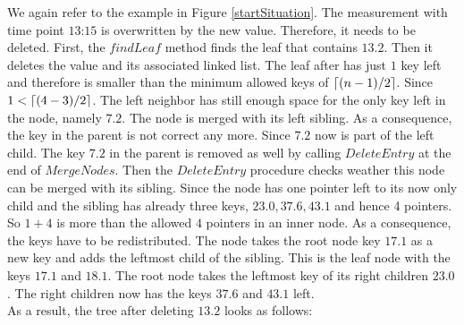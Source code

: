 \documentclass[abstracton,12pt]{scrreprt}
\DeclarePairedDelimiter\ceil{\lceil}{\rceil}
\begin{document}
\begin{exmp}
	We again refer to the example in Figure \ref{startSituation}. The measurement with time point $\text{13:15}$ is overwritten by the new value. Therefore, it needs to be deleted. First, the $findLeaf$ method finds the leaf that contains $13.2$. Then it deletes the value and its associated linked list. The leaf after has just $1$ key left and therefore is smaller than the minimum allowed keys of $\ceil{(n-1)/2}$. Since $1<\ceil{(4-3)/2}$. The left neighbor has still enough space for the only key left in the node, namely $7.2$. The node is merged with its left sibling. As a consequence, the key in the parent is not correct any more. Since $7.2$ now is part of the left child. The key $7.2$ in the parent is removed as well by calling $DeleteEntry$ at the end of $MergeNodes$. Then the $DeleteEntry$ procedure checks weather this node can be merged with its sibling. Since the node has one pointer left to its now only child and the sibling has already three keys, $23.0,37.6, 43.1$ and hence 4 pointers. So $1+4$ is more than the allowed $4$ pointers in an inner node. As a consequence, the keys have to be redistributed. The node takes the root node key $17.1$ as a new key and adds the leftmost child of the sibling. This is the leaf node with the keys $17.1$ and $18.1$. The root node takes the leftmost key of its right children $23.0$. The right children now has the keys $37.6$ and $43.1$ left. \\
	As a result, the tree after deleting $13.2$ looks as follows: 
\end{exmp}
\end{document}
